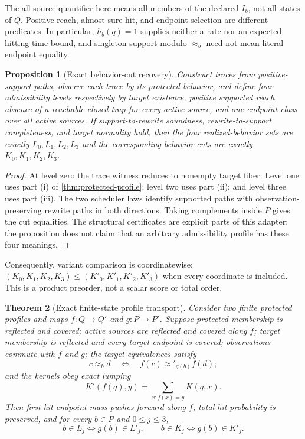 \documentclass[11pt]{article}
\newtheorem{theorem}{Theorem}[section]
\newtheorem{proposition}[theorem]{Proposition}
\theoremstyle{definition}
\theoremstyle{remark}
\numberwithin{equation}{section}
\begin{document}
The all-source quantifier here means all members of the declared $I_b$, not
all states of $Q$.  Positive reach, almost-sure hit, and endpoint selection are
different predicates.  In particular, $h_b(q)=1$ supplies neither a rate nor
an expected hitting-time bound, and singleton support modulo $\approx_b$ need
not mean literal endpoint equality.

\begin{proposition}[Exact behavior-cut recovery]
\label{prop:behavior-cut-recovery}
Construct traces from positive-support paths, observe each trace by its
protected behavior, and define four admissibility levels respectively by
target existence, positive supported reach, absence of a reachable closed
trap for every active source, and one endpoint class over all active sources.
If support-to-rewrite soundness, rewrite-to-support completeness, and target
normality hold, then the four realized-behavior sets are exactly $L_0,L_1,L_2,
L_3$ and the corresponding behavior cuts are exactly $K_0,K_1,K_2,K_3$.
\end{proposition}

\begin{proof}
At level zero the trace witness reduces to nonempty target fiber.  Level one
uses part (i) of \cref{thm:protected-profile}; level two uses part (ii); and
level three uses part (iii).  The two scheduler laws identify supported paths
with observation-preserving rewrite paths in both directions.  Taking
complements inside $P$ gives the cut equalities.  The structural certificates
are explicit parts of this adapter; the proposition does not claim that an
arbitrary admissibility profile has these four meanings.
\end{proof}

Consequently, variant comparison is coordinatewise:
$(K_0,K_1,K_2,K_3)\leq(K'_0,K'_1,K'_2,K'_3)$ when every coordinate is
included.  This is a product preorder, not a scalar score or total order.

\begin{theorem}[Exact finite-state profile transport]
\label{thm:protected-transport}
Consider two finite protected profiles and maps $f:Q\to Q'$ and
$g:P\to P'$.  Suppose protected membership is reflected and covered; active
sources are reflected and covered along $f$; target membership is reflected
and every target endpoint is covered; observations commute with $f$ and $g$;
the target equivalences satisfy
\[
 c\approx_b d\quad\Longleftrightarrow\quad
 f(c)\approx'_{g(b)}f(d);
\]
and the kernels obey exact lumping
\[
 K'(f(q),y)=\sum_{x:f(x)=y}K(q,x).
\]
Then first-hit endpoint mass pushes forward along $f$, total hit probability
is preserved, and for every $b\in P$ and $0\leq j\leq3$,
\[
 b\in L_j\Longleftrightarrow g(b)\in L'_j,
 \qquad
 b\in K_j\Longleftrightarrow g(b)\in K'_j.
\]
\end{theorem}
\end{document}
